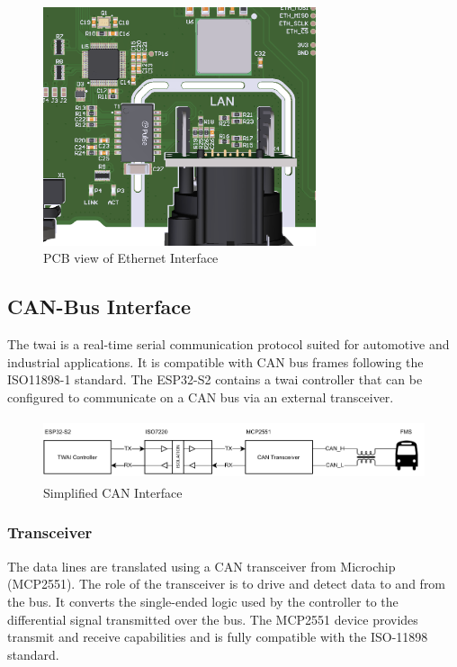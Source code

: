 \begin{figure}[h!]
	\centering
	\includegraphics[height=7cm]{images/eth-pcb}
	\caption{PCB view of Ethernet Interface}
	\vspace{-1.4ex}
	\label{fig:eth-pcb}
\end{figure}

\newpage

\subsection{CAN-Bus Interface}
The \acrfull{twai} is a real-time serial communication protocol suited for automotive and industrial applications. It is compatible with CAN bus frames following the ISO11898-1 standard. The ESP32-S2 contains a \acrshort{twai} controller that can be configured to communicate on a CAN bus via an external transceiver.

\begin{figure}[h!]
	\centering
	\includegraphics[height=1.8cm]{images/can-interface}
	\caption{Simplified CAN Interface}
	\vspace{-1.4ex}
	\label{fig:can-interface}
\end{figure}

\subsubsection{Transceiver}
The data lines are translated using a CAN transceiver from Microchip (MCP2551). The role of the transceiver is to drive and detect data to and from the bus. It converts the single-ended logic used by the controller to the differential signal transmitted over the bus. The MCP2551 device provides transmit and receive capabilities and is fully compatible with the ISO-11898 standard. \newline

